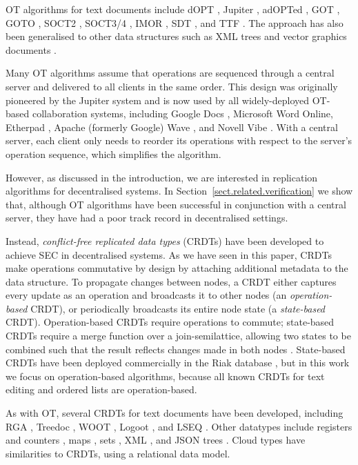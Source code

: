 OT algorithms for text documents include dOPT \cite{Ellis:1989ue}, Jupiter \cite{Nichols:1995fd}, adOPTed \cite{Ressel:1996wx}, GOT \cite{Sun:1998un}, GOTO \cite{Sun:1998vf}, SOCT2 \cite{Suleiman:1997gl,Suleiman:1998eu}, SOCT3/4 \cite{Vidot:2000ch}, IMOR \cite{Imine:2003ks}, SDT \cite{Li:2004er,Li:2008hw}, and TTF \cite{Oster:2006tr}.
The approach has also been generalised to other data structures such as XML trees \cite{Ignat:2003jy,Davis:2002iv,Jungnickel:2015ua} and vector graphics documents \cite{Sun:2002jb}.

Many OT algorithms assume that operations are sequenced through a central server and delivered to all clients in the same order.
This design was originally pioneered by the Jupiter system \cite{Nichols:1995fd} and is now used by all widely-deployed OT-based collaboration systems, including Google Docs \cite{DayRichter:2010tt}, Microsoft Word Online, Etherpad \cite{Etherpad:2011um}, Apache (formerly Google) Wave \cite{Wang:2015vo}, and Novell Vibe \cite{Spiewak:2010vw}.
With a central server, each client only needs to reorder its operations with respect to the server's operation sequence, which simplifies the algorithm.

However, as discussed in the introduction, we are interested in replication algorithms for decentralised systems.
In Section~\ref{sect.related.verification} we show that, although OT algorithms have been successful in conjunction with a central server, they have had a poor track record in decentralised settings.

Instead, \emph{conflict-free replicated data types} (CRDTs) have been developed to achieve SEC in decentralised systems.
As we have seen in this paper, CRDTs make operations commutative by design by attaching additional metadata to the data structure.
To propagate changes between nodes, a CRDT either captures every update as an operation and broadcasts it to other nodes (an \emph{operation-based} CRDT), or periodically broadcasts its entire node state (a \emph{state-based} CRDT).
Operation-based CRDTs require operations to commute; state-based CRDTs require a merge function over a join-semilattice, allowing two states to be combined such that the result reflects changes made in both nodes \cite{Shapiro:2011wy,Shapiro:2011un}.
State-based CRDTs have been deployed commercially in the Riak database \cite{Brown:2014hs}, but in this work we focus on operation-based algorithms, because all known CRDTs for text editing and ordered lists are operation-based.

As with OT, several CRDTs for text documents have been developed, including RGA \cite{Roh:2011dw}, Treedoc \cite{Preguica:2009fz}, WOOT \cite{Oster:2006wj}, Logoot \cite{Weiss:2010hx}, and LSEQ \cite{Nedelec:2013ky,Nedelec:2016eo}.
Other datatypes include registers and counters \cite{Shapiro:2011wy,Shapiro:2011un}, maps \cite{Baquero:2016iv}, sets \cite{Bieniusa:2012wu,Bieniusa:2012gt}, XML \cite{Martin:2010ih}, and JSON trees \cite{Kleppmann:2016ve}.
Cloud types \cite{Burckhardt:2012jy} have similarities to CRDTs, using a relational data model.


